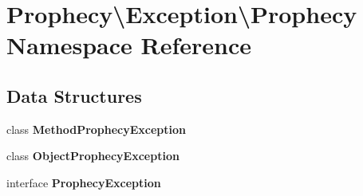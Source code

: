\section{Prophecy\textbackslash{}Exception\textbackslash{}Prophecy Namespace Reference}
\label{namespace_prophecy_1_1_exception_1_1_prophecy}
\subsection*{Data Structures}
\begin{DoxyCompactItemize}
\item 
class {\bf Method\+Prophecy\+Exception}
\item 
class {\bf Object\+Prophecy\+Exception}
\item 
interface {\bf Prophecy\+Exception}
\end{DoxyCompactItemize}
